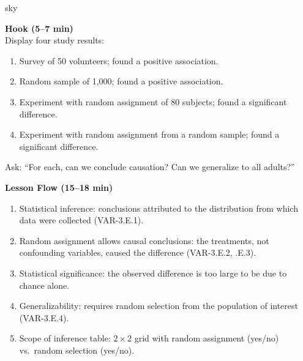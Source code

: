 \documentclass[10pt]{article}
\begin{document}
\begin{skillbox}{sky}
\begin{minipage}[t]{0.48\linewidth}
    \textbf{Hook (5--7 min)}\\
    Display four study results:
    \begin{enumerate}
        \item Survey of 50 volunteers; found a positive association.
        \item Random sample of 1{,}000; found a positive association.
        \item Experiment with random assignment of 80 subjects; found a significant
              difference.
        \item Experiment with random assignment from a random sample; found a
              significant difference.
    \end{enumerate}
    Ask: ``For each, can we conclude causation? Can we generalize to all adults?''
\end{minipage}
\hfill
\begin{minipage}[t]{0.48\linewidth}
    \textbf{Lesson Flow (15--18 min)}
    \begin{enumerate}
        \item Statistical inference: conclusions attributed to the distribution from
              which data were collected (VAR-3.E.1).
        \item Random assignment allows causal conclusions: the treatments, not
              confounding variables, caused the difference (VAR-3.E.2, .E.3).
        \item Statistical significance: the observed difference is too large to be
              due to chance alone.
        \item Generalizability: requires random selection from the population of
              interest (VAR-3.E.4).
        \item Scope of inference table: $2\times2$ grid with random assignment
              (yes/no) vs.\ random selection (yes/no).
    \end{enumerate}
\end{minipage}
\end{skillbox}
\end{document}
